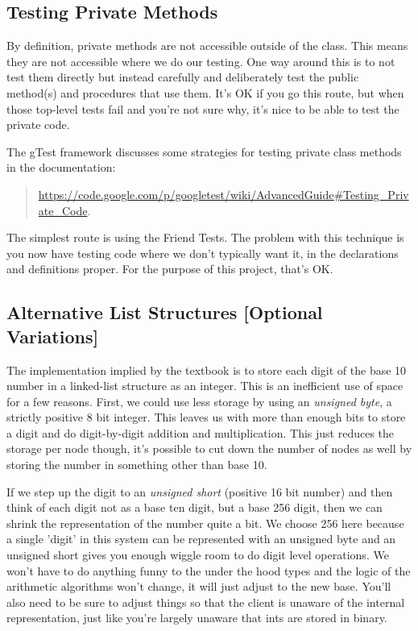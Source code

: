\documentclass[10pt]{article}
\begin{document}
\subsection*{Testing Private Methods}

By definition, private methods are not accessible outside of the class. This means they are not accessible where we do our testing. One way around this is to not test them directly but instead carefully and deliberately test the public method(s) and procedures that use them. It's OK if you go this route, but when those top-level tests fail and you're not sure why, it's nice to be able to test the private code.  

The gTest framework discusses some strategies for testing private class methods in the documentation:
\begin{quote}
\url{https://code.google.com/p/googletest/wiki/AdvancedGuide#Testing_Private_Code}. 
\end{quote}
The simplest route is using the Friend Tests.  The problem with this technique is you now have testing code where we don't typically want it, in the declarations and definitions proper. For the purpose of this project, that's OK. 



\subsection*{Alternative List Structures [Optional Variations]}

The implementation implied by the textbook is to store each digit of the base 10 number in a linked-list structure as an integer. This is an inefficient use of space for a few reasons. First, we could use less storage by using an \textit{unsigned byte}, a strictly positive 8 bit integer. This leaves us with more than enough bits to store a digit and do digit-by-digit addition and multiplication. This just reduces the storage per node though, it's possible to cut down the number of nodes as well by storing the number in something other than base 10. 

If we step up the digit to an \textit{unsigned short} (positive 16 bit number) and then think of each digit not as a base ten digit, but a base 256 digit, then we can shrink the representation of the number quite a bit. We choose 256 here because a single 'digit' in this system can be represented with an unsigned byte and an unsigned short gives you enough wiggle room to do digit level operations. We won't have to do anything funny to the under the hood types and the logic of the arithmetic algorithms won't change, it will just adjust to the new base. You'll also need to be sure to adjust things so that the client is unaware of the internal representation, just like you're largely unaware that ints are stored in binary. 
\end{document}
